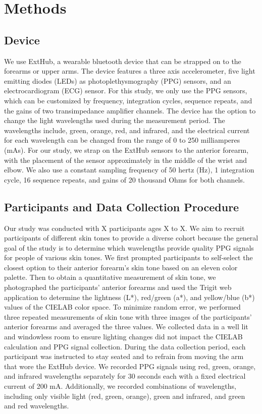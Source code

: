 \documentclass[letterpaper, 10 pt, conference]{ieeeconf}  %
\begin{document}
\section{Methods}
\subsection{Device}
We use ExtHub, a wearable bluetooth device that can be strapped on to the forearms or upper arms. The device features a three axis accelerometer, five light emitting diodes (LEDs) as photoplethysmography (PPG) sensors, and an electrocardiogram (ECG) sensor. For this study, we only use the PPG sensors, which can be customized by frequency, integration cycles, sequence repeats, and the gains of two transimpedance amplifier channels. The device has the option to change the light wavelengths used during the measurement period. The wavelengths include, green, orange, red, and infrared, and the electrical current for each wavelength can be changed from the range of 0 to 250 milliamperes (mAs). For our study, we strap on the ExtHub sensors to the anterior forearm, with the placement of the sensor approximately in the middle of the wrist and elbow. We also use a constant sampling frequency of 50 hertz (Hz), 1 integration cycle, 16 sequence repeats, and gains of 20 thousand Ohms for both channels.

\subsection{Participants and Data Collection Procedure}
Our study was conducted with X participants ages X to X. We aim to recruit participants of different skin tones to provide a diverse cohort because the general goal of the study is to determine which wavelengths provide quality PPG signals for people of various skin tones. We first prompted participants to self-select the closest option to their anterior forearm’s skin tone based on an eleven color palette. Then to obtain a quantitative measurement of skin tone, we photographed the participants’ anterior forearms and used the Trigit web application \cite{tjandra_trigit_2023} to determine the lightness (L*), red/green (a*), and yellow/blue (b*) values of the CIELAB color space. To minimize random error, we performed three repeated measurements of skin tone with three images of the participants’ anterior forearms and averaged the three values. We collected data in a well lit and windowless room to ensure lighting changes did not impact the CIELAB calculation and PPG signal collection. During the data collection period, each participant was instructed to stay seated and to refrain from moving the arm that wore the ExtHub device. We recorded PPG signals using red, green, orange, and infrared wavelengths separately for 30 seconds each with a fixed electrical current of 200 mA. Additionally, we recorded combinations of wavelengths, including only visible light (red, green, orange), green and infrared, and green and red wavelengths.
\end{document}
